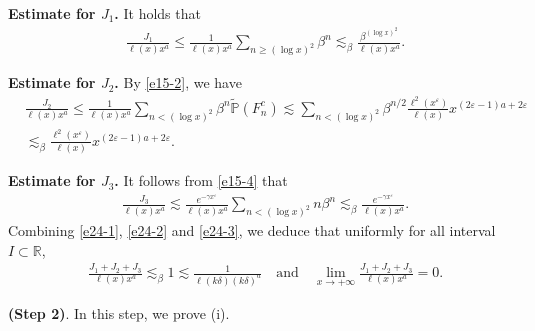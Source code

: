 \documentclass[11pt]{article}
\numberwithin{equation}{section}
\begin{document}
\noindent
{\bf Estimate for $J_1$.} It holds that 
\begin{align}\label{e24-1}
	& \frac{J_1}{\ell(x) x^a }   \leq \frac{1}{\ell(x) x^a } \sum_{n\geq (\log x)^2}  \beta^{n} \lesssim_\beta \frac{\beta^{(\log x)^2}}{\ell(x) x^a } . 
\end{align}

\noindent
{\bf Estimate for $J_2$.} By \eqref{e15-2}, we have 
\begin{align}\label{e24-2}
	& \frac{J_2}{\ell(x) x^a }  \leq \frac{1}{\ell(x) x^a } \sum_{n< (\log x)^2}  \beta^{n}\widetilde{\mathbb{P}}\left(F_n^c\right) \lesssim \sum_{n< (\log x)^2}  \beta^{n/2} \frac{\ell^2(x^{\varepsilon}) }{\ell(x) } x^{(2\varepsilon-1)a + 2\varepsilon}\nonumber\\
	&\lesssim_\beta \frac{\ell^2(x^{\varepsilon}) }{\ell(x) } x^{(2\varepsilon-1)a + 2\varepsilon}.
\end{align}

\noindent
{\bf Estimate for $J_3$.}  It follows from  \eqref{e15-4} that 
\begin{align}\label{e24-3}
	& \frac{J_3}{\ell(x) x^a } \lesssim \frac{e^{-\gamma x^{\varepsilon}}}{\ell(x) x^a } \sum_{n < (\log x)^2}  n\beta^{n} \lesssim_\beta \frac{e^{-\gamma x^{\varepsilon}}}{\ell(x) x^a } . 
\end{align}
Combining \eqref{e24-1}, \eqref{e24-2} and \eqref{e24-3}, we deduce that uniformly for all  interval $I\subset \mathbb{R}$, 
\begin{align}\label{e24-4}
	& \frac{J_1+J_2+J_3}{\ell(x) x^a }\lesssim_\beta 1\lesssim \frac{1}{\ell(k\delta)(k\delta)^a}\quad\mbox{and}\quad  \lim_{x\to+\infty} \frac{J_1+J_2+J_3}{\ell(x) x^a }  =0. 
\end{align}

\noindent
{\bf(Step 2)}. In this step, we prove (i).  
\end{document}
